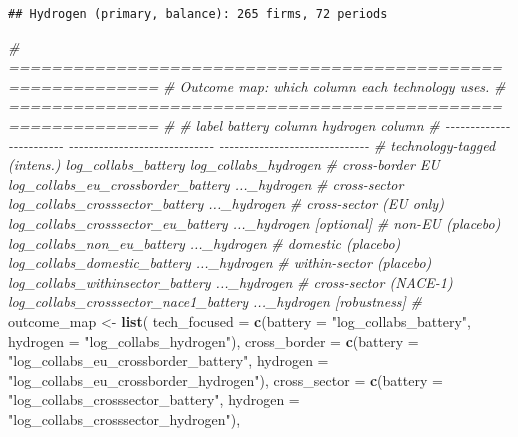 \documentclass[
]{article}
\newenvironment{Shaded}{\begin{snugshade}}{\end{snugshade}}
\newcommand{\AttributeTok}[1]{\textcolor[rgb]{0.13,0.29,0.53}{#1}}
\newcommand{\CommentTok}[1]{\textcolor[rgb]{0.56,0.35,0.01}{\textit{#1}}}
\newcommand{\FunctionTok}[1]{\textcolor[rgb]{0.13,0.29,0.53}{\textbf{#1}}}
\newcommand{\NormalTok}[1]{#1}
\newcommand{\OtherTok}[1]{\textcolor[rgb]{0.56,0.35,0.01}{#1}}
\newcommand{\StringTok}[1]{\textcolor[rgb]{0.31,0.60,0.02}{#1}}
\begin{document}
\begin{verbatim}
## Hydrogen (primary, balance): 265 firms, 72 periods
\end{verbatim}

\begin{Shaded}
\begin{Highlighting}[]
\CommentTok{\# ============================================================}
\CommentTok{\# Outcome map: which column each technology uses.}
\CommentTok{\# ============================================================}
\CommentTok{\#}
\CommentTok{\#   label                     battery column                 hydrogen column}
\CommentTok{\#   {-}{-}{-}{-}{-}{-}{-}{-}{-}{-}{-}{-}{-}{-}{-}{-}{-}{-}{-}{-}{-}{-}{-}{-}  {-}{-}{-}{-}{-}{-}{-}{-}{-}{-}{-}{-}{-}{-}{-}{-}{-}{-}{-}{-}{-}{-}{-}{-}{-}{-}{-}{-}{-}  {-}{-}{-}{-}{-}{-}{-}{-}{-}{-}{-}{-}{-}{-}{-}{-}{-}{-}{-}{-}{-}{-}{-}{-}{-}{-}{-}{-}{-}{-}}
\CommentTok{\#   technology{-}tagged (intens.)  log\_collabs\_battery         log\_collabs\_hydrogen}
\CommentTok{\#   cross{-}border EU           log\_collabs\_eu\_crossborder\_battery  ...\_hydrogen}
\CommentTok{\#   cross{-}sector              log\_collabs\_crosssector\_battery     ...\_hydrogen}
\CommentTok{\#   cross{-}sector (EU only)    log\_collabs\_crosssector\_eu\_battery  ...\_hydrogen   [optional]}
\CommentTok{\#   non{-}EU (placebo)          log\_collabs\_non\_eu\_battery          ...\_hydrogen}
\CommentTok{\#   domestic (placebo)        log\_collabs\_domestic\_battery        ...\_hydrogen}
\CommentTok{\#   within{-}sector (placebo)   log\_collabs\_withinsector\_battery    ...\_hydrogen}
\CommentTok{\#   cross{-}sector (NACE{-}1)     log\_collabs\_crosssector\_nace1\_battery  ...\_hydrogen  [robustness]}
\CommentTok{\#}
\NormalTok{outcome\_map }\OtherTok{\textless{}{-}} \FunctionTok{list}\NormalTok{(}
  \AttributeTok{tech\_focused =} \FunctionTok{c}\NormalTok{(}\AttributeTok{battery =} \StringTok{"log\_collabs\_battery"}\NormalTok{,}
                   \AttributeTok{hydrogen =} \StringTok{"log\_collabs\_hydrogen"}\NormalTok{),}
  \AttributeTok{cross\_border =} \FunctionTok{c}\NormalTok{(}\AttributeTok{battery =} \StringTok{"log\_collabs\_eu\_crossborder\_battery"}\NormalTok{,}
                   \AttributeTok{hydrogen =} \StringTok{"log\_collabs\_eu\_crossborder\_hydrogen"}\NormalTok{),}
  \AttributeTok{cross\_sector =} \FunctionTok{c}\NormalTok{(}\AttributeTok{battery =} \StringTok{"log\_collabs\_crosssector\_battery"}\NormalTok{,}
                   \AttributeTok{hydrogen =} \StringTok{"log\_collabs\_crosssector\_hydrogen"}\NormalTok{),}

\end{Highlighting}
\end{Shaded}
\end{document}
